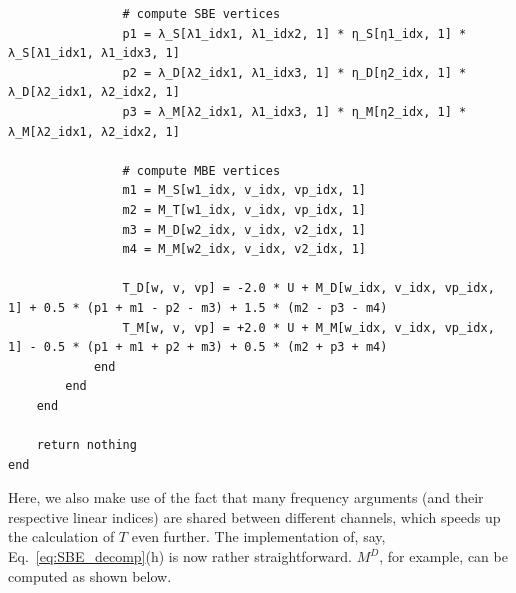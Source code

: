 \documentclass{SciPost}
\begin{document}
\begin{verbatim}
                # compute SBE vertices
                p1 = λ_S[λ1_idx1, λ1_idx2, 1] * η_S[η1_idx, 1] * λ_S[λ1_idx1, λ1_idx3, 1]
                p2 = λ_D[λ2_idx1, λ1_idx3, 1] * η_D[η2_idx, 1] * λ_D[λ2_idx1, λ2_idx2, 1]
                p3 = λ_M[λ2_idx1, λ1_idx3, 1] * η_M[η2_idx, 1] * λ_M[λ2_idx1, λ2_idx2, 1]

                # compute MBE vertices
                m1 = M_S[w1_idx, v_idx, vp_idx, 1]
                m2 = M_T[w1_idx, v_idx, vp_idx, 1]
                m3 = M_D[w2_idx, v_idx, v2_idx, 1]
                m4 = M_M[w2_idx, v_idx, v2_idx, 1]

                T_D[w, v, vp] = -2.0 * U + M_D[w_idx, v_idx, vp_idx, 1] + 0.5 * (p1 + m1 - p2 - m3) + 1.5 * (m2 - p3 - m4) 
                T_M[w, v, vp] = +2.0 * U + M_M[w_idx, v_idx, vp_idx, 1] - 0.5 * (p1 + m1 + p2 + m3) + 0.5 * (m2 + p3 + m4)
            end
        end
    end

    return nothing 
end
\end{verbatim}
%
Here, we also make use of the fact that many frequency arguments (and their respective linear indices) are shared between different channels, which speeds up the calculation of $T$ even further. The implementation of, say, Eq.~\eqref{eq:SBE_decomp}(h) is now rather straightforward. $M^D$, for example, can be computed as shown below.
%
\end{document}
